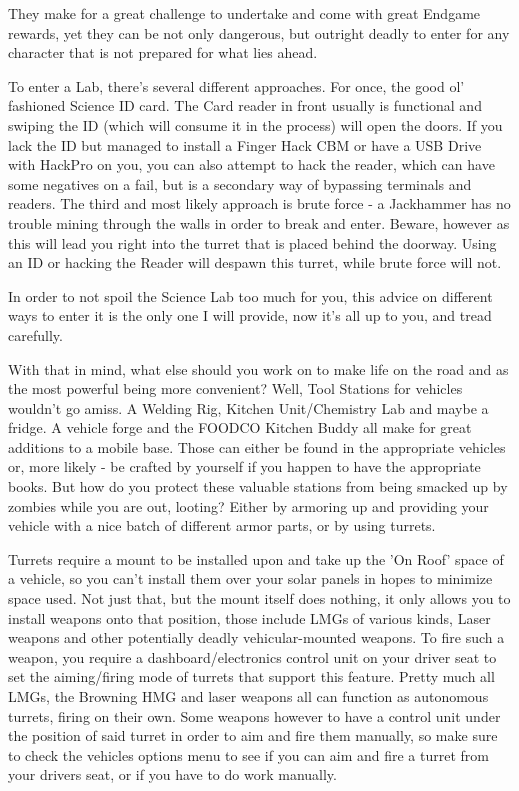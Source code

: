 \documentclass[11pt]{report}
\begin{document}
They make for a great challenge to undertake and come with great Endgame rewards, yet they can be not only dangerous, but outright deadly to enter for any character that is not prepared for what lies ahead.

To enter a Lab, there's several different approaches. For once, the good ol' fashioned Science ID card. The Card reader in front usually is functional and swiping the ID (which will consume it in the process) will open the doors. If you lack the ID but managed to install a Finger Hack CBM or have a USB Drive with HackPro on you, you can also attempt to hack the reader, which can have some negatives on a fail, but is a secondary way of bypassing terminals and readers. The third and most likely approach is brute force - a Jackhammer has no trouble mining through the walls in order to break and enter. Beware, however as this will lead you right into the turret that is placed behind the doorway. Using an ID or hacking the Reader will despawn this turret, while brute force will not.

In order to not spoil the Science Lab too much for you, this advice on different ways to enter it is the only one I will provide, now it's all up to you, and tread carefully.

With that in mind, what else should you work on to make life on the road and as the most powerful being more convenient? Well, Tool Stations for vehicles wouldn't go amiss. A Welding Rig, Kitchen Unit/Chemistry Lab and maybe a fridge. A vehicle forge and the FOODCO Kitchen Buddy all make for great additions to a mobile base. Those can either be found in the appropriate vehicles or, more likely - be crafted by yourself if you happen to have the appropriate books. But how do you protect these valuable stations from being smacked up by zombies while you are out, looting? Either by armoring up and providing your vehicle with a nice batch of different armor parts, or by using turrets.

Turrets require a mount to be installed upon and take up the 'On Roof' space of a vehicle, so you can't install them over your solar panels in hopes to minimize space used. Not just that, but the mount itself does nothing, it only allows you to install weapons onto that position, those include LMGs of various kinds, Laser weapons and other potentially deadly vehicular-mounted weapons. To fire such a weapon, you require a dashboard/electronics control unit on your driver seat to set the aiming/firing mode of turrets that support this feature. Pretty much all LMGs, the Browning HMG and laser weapons all can function as autonomous turrets, firing on their own. Some weapons however to have a control unit under the position of said turret in order to aim and fire them manually, so make sure to check the vehicles options menu to see if you can aim and fire a turret from your drivers seat, or if you have to do work manually.
\end{document}
